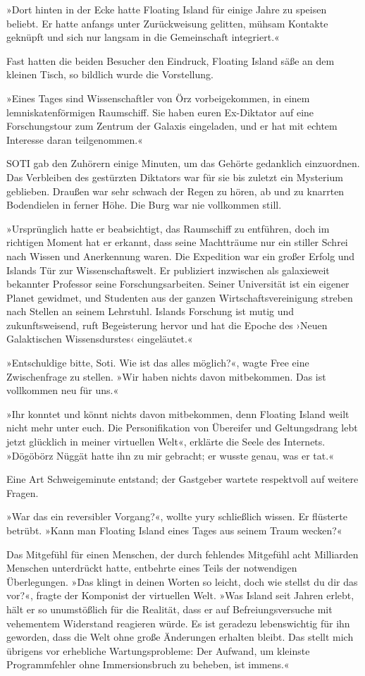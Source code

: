 »Dort hinten in der Ecke hatte Floating Island für einige Jahre zu speisen beliebt. Er hatte anfangs unter Zurückweisung gelitten, mühsam Kontakte geknüpft und sich nur langsam in die Gemeinschaft integriert.«

Fast hatten die beiden Besucher den Eindruck, Floating Island säße an dem kleinen Tisch, so bildlich wurde die Vorstellung.

»Eines Tages sind Wissenschaftler von Örz vorbeigekommen, in einem lemniskatenförmigen Raumschiff. Sie haben euren Ex-Diktator auf eine Forschungstour zum Zentrum der Galaxis eingeladen, und er hat mit echtem Interesse daran teilgenommen.«

SOTI gab den Zuhörern einige Minuten, um das Gehörte gedanklich einzuordnen. Das Verbleiben des gestürzten Diktators war für sie bis zuletzt ein Mysterium geblieben. Draußen war sehr schwach der Regen zu hören, ab und zu knarrten Bodendielen in ferner Höhe. Die Burg war nie vollkommen still.

»Ursprünglich hatte er beabsichtigt, das Raumschiff zu entführen, doch im richtigen Moment hat er erkannt, dass seine Machtträume nur ein stiller Schrei nach Wissen und Anerkennung waren. Die Expedition war ein großer Erfolg und Islands Tür zur Wissenschaftswelt. Er publiziert inzwischen als galaxieweit bekannter Professor seine Forschungsarbeiten. Seiner Universität ist ein eigener Planet gewidmet, und Studenten aus der ganzen Wirtschaftsvereinigung streben nach Stellen an seinem Lehrstuhl. Islands Forschung ist mutig und zukunftsweisend, ruft Begeisterung hervor und hat die Epoche des ›Neuen Galaktischen Wissensdurstes‹ eingeläutet.«

»Entschuldige bitte, Soti. Wie ist das alles möglich?«, wagte Free eine Zwischenfrage zu stellen. »Wir haben nichts davon mitbekommen. Das ist vollkommen neu für uns.«

»Ihr konntet und könnt nichts davon mitbekommen, denn Floating Island weilt nicht mehr unter euch. Die Personifikation von Übereifer und Geltungsdrang lebt jetzt glücklich in meiner virtuellen Welt«, erklärte die Seele des Internets. »Dögöbörz Nüggät hatte ihn zu mir gebracht; er wusste genau, was er tat.«

Eine Art Schweigeminute entstand; der Gastgeber wartete respektvoll auf weitere Fragen.

»War das ein reversibler Vorgang?«, wollte yury schließlich wissen. Er flüsterte betrübt. »Kann man Floating Island eines Tages aus seinem Traum wecken?«

Das Mitgefühl für einen Menschen, der durch fehlendes Mitgefühl acht Milliarden Menschen unterdrückt hatte, entbehrte eines Teils der notwendigen Überlegungen. »Das klingt in deinen Worten so leicht, doch wie stellst du dir das vor?«, fragte der Komponist der virtuellen Welt. »Was Island seit Jahren erlebt, hält er so unumstößlich für die Realität, dass er auf Befreiungsversuche mit vehementem Widerstand reagieren würde. Es ist geradezu lebenswichtig für ihn geworden, dass die Welt ohne große Änderungen erhalten bleibt. Das stellt mich übrigens vor erhebliche Wartungsprobleme: Der Aufwand, um kleinste Programmfehler ohne Immersionsbruch zu beheben, ist immens.«

